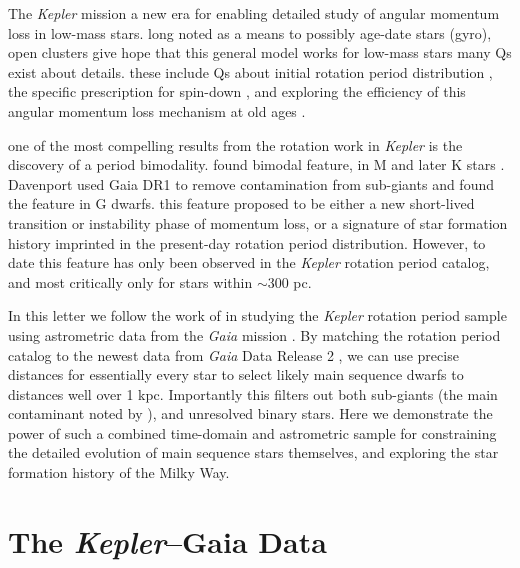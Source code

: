 \documentclass[preprint2]{aastex62}
\newcommand{\Kepler}{\textsl{Kepler}\xspace}
\begin{document}
The \Kepler mission \citep{borucki2010} a new era for enabling detailed study of angular momentum loss in low-mass stars. long noted as a means to possibly age-date stars (gyro), open clusters give hope that this general model works for low-mass stars
many Qs exist about details. these include Qs about initial rotation period distribution \citep[e.g.][]{barnes2010,matt2015}, the specific prescription for spin-down \citep{angus2015}, and exploring the efficiency of this angular momentum loss mechanism at old ages \citep{van-saders2016}.


one of the most compelling results from the rotation work in \Kepler is the discovery of a period bimodality. 
\citet{mcquillan2013} found bimodal feature, in M and later K stars \citep{mcquillan2014}. Davenport used Gaia DR1 to remove contamination from sub-giants and found the feature in G dwarfs. this feature proposed to be either a new short-lived transition or instability phase of momentum loss, or a signature of star formation history imprinted in the present-day rotation period distribution. However, to date this feature has only been observed in the \Kepler rotation period catalog, and most critically only for stars within $\sim$300 pc.



In this letter we follow the work of \citet{davenport2017} in studying the \Kepler rotation period sample using astrometric data from the {\em Gaia} mission \citep{gaia}. By matching the \citet{mcquillan2014} rotation period catalog to the newest data from {\em Gaia} Data Release 2 \citep{gaia_dr2}, we can use precise distances for essentially every star to select likely main sequence dwarfs to distances well over 1 kpc. Importantly this filters out both sub-giants (the main contaminant noted by \cite{davenport2017}), and unresolved binary stars.
Here we demonstrate the power of such a combined time-domain and astrometric sample for constraining the detailed evolution of main sequence stars themselves, and exploring the star formation history of the Milky Way.
 



\section{The \Kepler--Gaia Data}

\end{document}
